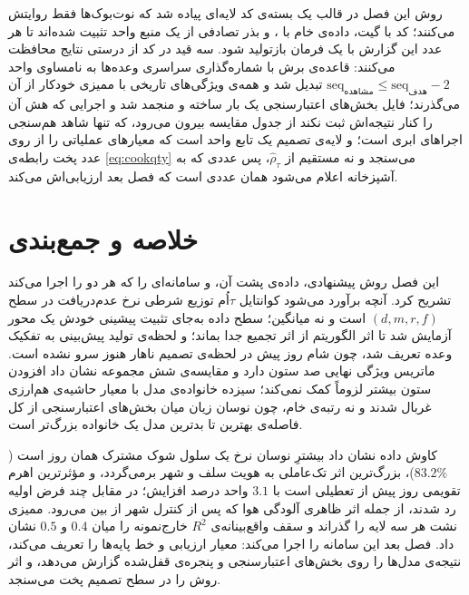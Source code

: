 روش این فصل در قالب یک بسته‌ی کد لایه‌ای پیاده شد که نوت‌بوک‌ها فقط روایتش می‌کنند؛ کد با
گیت، داده‌ی خام با ، و بذر تصادفی از یک منبع واحد تثبیت شده‌اند تا هر
عدد این گزارش با یک فرمان بازتولید شود. سه قید در کد از درستی نتایج محافظت می‌کنند:
قاعده‌ی برش با شماره‌گذاری سراسری وعده‌ها به نامساوی واحد
$\mathrm{seq}_{\text{مشاهده}} \le \mathrm{seq}_{\text{هدف}} - 2$ تبدیل شد و همه‌ی
ویژگی‌های تاریخی با ممیزی خودکار از آن می‌گذرند؛ فایل بخش‌های اعتبارسنجی یک بار ساخته و
منجمد شد و اجرایی که هش آن را کنار نتیجه‌اش ثبت نکند از جدول مقایسه بیرون می‌رود، که تنها
شاهد هم‌سنجی اجراهای ابری است؛ و لایه‌ی تصمیم یک تابع واحد است که معیارهای عملیاتی را از
روی عدد پخت رابطه‌ی \ref{eq:cookqty} می‌سنجد و نه مستقیم از $\hat\rho_\tau$، پس عددی که
به آشپزخانه اعلام می‌شود همان عددی است که فصل بعد ارزیابی‌اش می‌کند.

\section{خلاصه و جمع‌بندی}
\label{sec:3-5}

این فصل روش پیشنهادی، داده‌ی پشت آن، و سامانه‌ای را که هر دو را اجرا می‌کند تشریح کرد.
آنچه برآورد می‌شود کوانتایل $\tau$اُم توزیع شرطی نرخ عدم‌دریافت در سطح $(d,m,r,f)$ است و
نه میانگین؛ سطح داده به‌جای تثبیت پیشینی خودش یک محور آزمایش شد تا اثر الگوریتم از اثر
تجمیع جدا بماند؛ و لحظه‌ی تولید پیش‌بینی به تفکیک وعده تعریف شد، چون شام روز پیش در
لحظه‌ی تصمیم ناهار هنوز سرو نشده است. ماتریس ویژگی نهایی صد ستون دارد و مقایسه‌ی شش
مجموعه نشان داد افزودن ستون بیشتر لزوماً کمک نمی‌کند؛ سیزده خانواده‌ی مدل با معیار
حاشیه‌ی هم‌ارزی غربال شدند و نه رتبه‌ی خام، چون نوسان زیان میان بخش‌های اعتبارسنجی از کل
فاصله‌ی بهترین تا بدترین مدل یک خانواده بزرگ‌تر است.

کاوش داده نشان داد بیشترِ نوسان نرخ یک سلول شوک مشترک همان روز است ($83.2\%$)، بزرگ‌ترین
اثر تک‌عاملی به هویت سلف و شهر برمی‌گردد، و مؤثرترین اهرم تقویمی روز پیش از تعطیلی است با
$3.1$ واحد درصد افزایش؛ در مقابل چند فرض اولیه رد شدند، از جمله اثر ظاهری آلودگی هوا که
پس از کنترل شهر از بین می‌رود. ممیزی نشت هر سه لایه را گذراند و سقف واقع‌بینانه‌ی $R^2$
خارج‌نمونه را میان $0.4$ و $0.5$ نشان داد. فصل بعد این سامانه را اجرا می‌کند: معیار
ارزیابی و خط پایه‌ها را تعریف می‌کند، نتیجه‌ی مدل‌ها را روی بخش‌های اعتبارسنجی و پنجره‌ی
قفل‌شده گزارش می‌دهد، و اثر روش را در سطح تصمیم پخت می‌سنجد.

